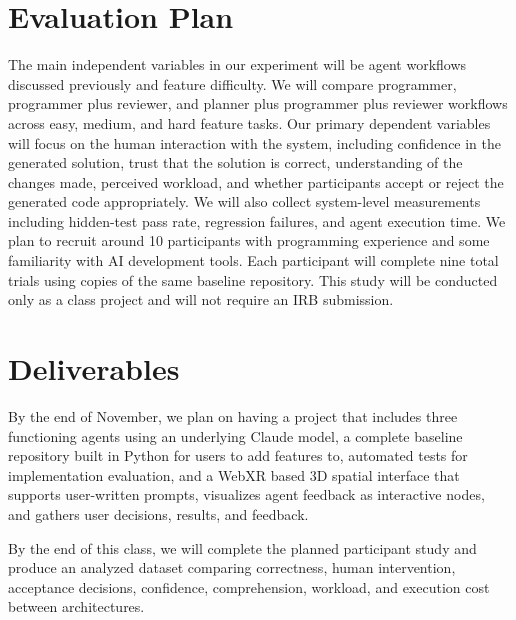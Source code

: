\documentclass{chi-ext}
\begin{document}
\section{Evaluation Plan}
The main independent variables in our experiment will be agent workflows discussed previously and feature difficulty. We will compare programmer, programmer plus reviewer, and planner plus programmer plus reviewer workflows across easy, medium, and hard feature tasks. Our primary dependent variables will focus on the human interaction with the system, including confidence in the generated solution, trust that the solution is correct, understanding of the changes made, perceived workload, and whether participants accept or reject the generated code appropriately. We will also collect system-level measurements including hidden-test pass rate, regression failures, and agent execution time. We plan to recruit around 10 participants with programming experience and some familiarity with AI development tools. Each participant will complete nine total trials using copies of the same baseline repository. This study will be conducted only as a class project and will not require an IRB submission.

\section{Deliverables}
By the end of November, we plan on having a project that includes three functioning agents using an underlying Claude model, a complete baseline repository built in Python for users to add features to, automated tests for implementation evaluation, and a WebXR based 3D spatial interface that supports user-written prompts, visualizes agent feedback as interactive nodes, and gathers user decisions, results, and feedback. 

By the end of this class, we will complete the planned participant study and produce an analyzed dataset comparing correctness, human intervention, acceptance decisions, confidence, comprehension, workload, and execution cost between architectures.

\end{document}
